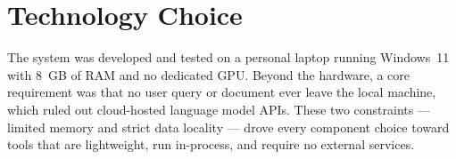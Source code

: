 \section{Technology Choice}
\label{sec:design-techchoice}

The system was developed and tested on a personal laptop running Windows~11
with 8~GB of RAM and no dedicated GPU. Beyond the hardware, a core requirement
was that no user query or document ever leave the local machine, which ruled
out cloud-hosted language model APIs. These two constraints — limited memory
and strict data locality — drove every component choice toward tools that are
lightweight, run in-process, and require no external services.

